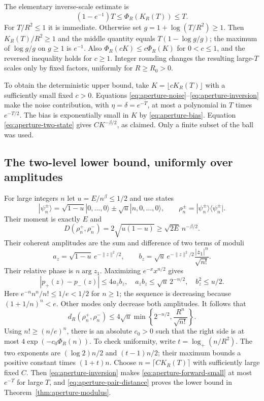 The elementary inverse-scale estimate is
\[
 (1-e^{-1})T\le\Phi_R(K_R(T))\le T.
 \tag{A.13}\label{eq:aperture-inversion}
\]
For $T/R^2\le1$ it is immediate. Otherwise set
$g=1+\log(T/R^2)\ge1$. Then $K_R(T)/R^2\ge1$ and the middle quantity equals
$T(1-\log g/g)$; the maximum of $\log g/g$ on $g\ge1$ is $e^{-1}$.
Also $\Phi_R(cK)\le c\Phi_R(K)$ for $0<c\le1$, and the reversed inequality
holds for $c\ge1$. Integer rounding changes the resulting large-$T$ scales
only by fixed factors, uniformly for $R\ge R_0>0$.

To obtain the deterministic upper bound, take
$K=\lfloor cK_R(T)\rfloor$ with a sufficiently small fixed $c>0$.
Equations \eqref{eq:aperture-noise}--\eqref{eq:aperture-inversion} make the
noise contribution, with $\eta=\delta=e^{-T}$, at most a polynomial in $T$
times $e^{-T/2}$. The bias is exponentially small in $K$ by
\eqref{eq:aperture-bias}. Equation \eqref{eq:aperture-two-state} gives
$C K^{-\beta/2}$, as claimed. Only a finite subset of the ball was used.

\subsection{The two-level lower bound, uniformly over amplitudes}
For large integers $n$ let $u=E/n^\beta\le1/2$ and use states
\[
 |\psi_n^\pm\rangle=\sqrt{1-u}|0,\ldots,0\rangle
       \pm\sqrt u|n,0,\ldots,0\rangle,\qquad
 \rho_n^\pm=|\psi_n^\pm\rangle\langle\psi_n^\pm|.
 \tag{A.14}\label{eq:aperture-pair}
\]
Their moment is exactly $E$ and
\[
 D(\rho_n^+,\rho_n^-)=2\sqrt{u(1-u)}\ge\sqrt{2E}\,n^{-\beta/2}.
 \tag{A.15}\label{eq:aperture-pair-distance}
\]
Their coherent amplitudes are the sum and difference of two terms of moduli
\[
 a_z=\sqrt{1-u}\,e^{-\|z\|^2/2},\qquad
 b_z=\sqrt u\,e^{-\|z\|^2/2}\frac{|z_1|^n}{\sqrt{n!}}.
\]
Their relative phase is $n\arg z_1$. Maximizing $e^{-x}x^{n/2}$ gives
\[
 |p_+(z)-p_-(z)|\le4a_zb_z,
 \quad a_zb_z\le\sqrt u\,2^{-n/2},
 \quad b_z^2\le u/2.
 \tag{A.16}\label{eq:aperture-amplitudes}
\]
Here $e^{-n}n^n/n!\le1/e<1/2$ for $n\ge1$; the sequence is decreasing
because $(1+1/n)^n<e$. Other modes only decrease both amplitudes.
It follows that
\[
 d_R(\rho_n^+,\rho_n^-)
 \le4\sqrt u\min\left\{2^{-n/2},\frac{R^n}{\sqrt{n!}}\right\}.
 \tag{A.17}\label{eq:aperture-forward-small}
\]
Using $n!\ge(n/e)^n$, there is an absolute $c_0>0$ such that the right side
is at most $4\exp(-c_0\Phi_R(n))$. To check uniformity, write
$t=\log_+(n/R^2)$. The two exponents are
$(\log2)n/2$ and $(t-1)n/2$; their maximum bounds a positive constant times
$(1+t)n$. Choose $n=\lceil C K_R(T)\rceil$ with sufficiently large fixed $C$.
Then \eqref{eq:aperture-inversion} makes \eqref{eq:aperture-forward-small}
at most $e^{-T}$ for large $T$, and \eqref{eq:aperture-pair-distance} proves
the lower bound in Theorem~\ref{thm:aperture-modulus}.

